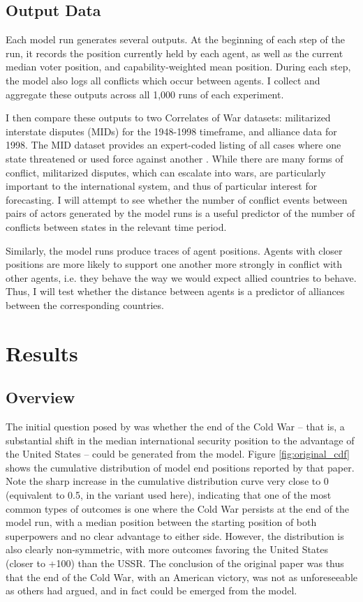 \subsection{Output Data} \label{outputs}

Each model run generates several outputs. At the beginning of each step of the run, it records the position currently held by each agent, as well as the current median voter position, and capability-weighted mean position. During each step, the model also logs all conflicts which occur between agents. I collect and aggregate these outputs across all 1,000 runs of each experiment.

I then compare these outputs to two Correlates of War datasets: militarized interstate disputes (MIDs) for the 1948-1998 timeframe, and alliance data for 1998. The MID dataset provides an expert-coded listing of all cases where one state threatened or used force against another \citep{jones_1996}. While there are many forms of conflict, militarized disputes, which can escalate into wars, are particularly important to the international system, and thus of particular interest for forecasting. I will attempt to see whether the number of conflict events between pairs of actors generated by the model runs is a useful predictor of the number of conflicts between states in the relevant time period. 

Similarly, the model runs produce traces of agent positions. Agents with closer positions are more likely to support one another more strongly in conflict with other agents, i.e. they behave the way we would expect allied countries to behave. Thus, I will test whether the distance between agents is a predictor of alliances between the corresponding countries.

\section{Results} \label{results}

\subsection{Overview}

The initial question posed by \citet{bdm_1998} was whether the end of the Cold War -- that is, a substantial shift in the median international security position to the advantage of the United States -- could be generated from the model. Figure \ref{fig:original_cdf} shows the cumulative distribution of model end positions reported by that paper. Note the sharp increase in the cumulative distribution curve very close to 0 (equivalent to 0.5, in the variant used here), indicating that one of the most common types of outcomes is one where the Cold War persists at the end of the model run, with a median position between the starting position of both superpowers and no clear advantage to either side. However, the distribution is also clearly non-symmetric, with more outcomes favoring the United States (closer to +100) than the USSR. The conclusion of the original paper was thus that the end of the Cold War, with an American victory, was not as unforeseeable as others had argued, and in fact could be emerged from the model.


